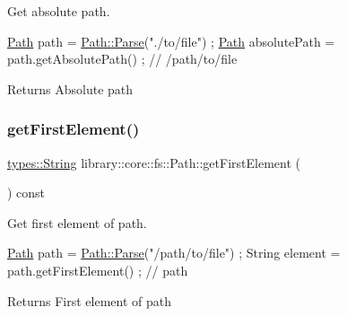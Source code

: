 Get absolute path. 


\begin{DoxyCode}
\hyperlink{classlibrary_1_1core_1_1fs_1_1_path_aaba9a8e0153813f08f78f1c3275734a4}{Path} path = \hyperlink{classlibrary_1_1core_1_1fs_1_1_path_aebf5bd3af83e0b7376616e146f3e55df}{Path::Parse}(\textcolor{stringliteral}{"./to/file"}) ;
\hyperlink{classlibrary_1_1core_1_1fs_1_1_path_aaba9a8e0153813f08f78f1c3275734a4}{Path} absolutePath = path.getAbsolutePath() ; \textcolor{comment}{// /path/to/file}
\end{DoxyCode}


\begin{DoxyReturn}{Returns}
Absolute path 
\end{DoxyReturn}
\mbox{\label{classlibrary_1_1core_1_1fs_1_1_path_a431c7842c8a0d5fc314b676a8487e5af}} 
\subsubsection{\texorpdfstring{get\+First\+Element()}{getFirstElement()}}
{\footnotesize\ttfamily \hyperlink{classlibrary_1_1core_1_1types_1_1_string}{types\+::\+String} library\+::core\+::fs\+::\+Path\+::get\+First\+Element (\begin{DoxyParamCaption}{ }\end{DoxyParamCaption}) const}



Get first element of path. 


\begin{DoxyCode}
\hyperlink{classlibrary_1_1core_1_1fs_1_1_path_aaba9a8e0153813f08f78f1c3275734a4}{Path} path = \hyperlink{classlibrary_1_1core_1_1fs_1_1_path_aebf5bd3af83e0b7376616e146f3e55df}{Path::Parse}(\textcolor{stringliteral}{"/path/to/file"}) ;
String element = path.getFirstElement() ; \textcolor{comment}{// path}
\end{DoxyCode}


\begin{DoxyReturn}{Returns}
First element of path 
\end{DoxyReturn}
\mbox{\label{classlibrary_1_1core_1_1fs_1_1_path_a3e29def9459dd51f1c359435aae4ead1}} 
